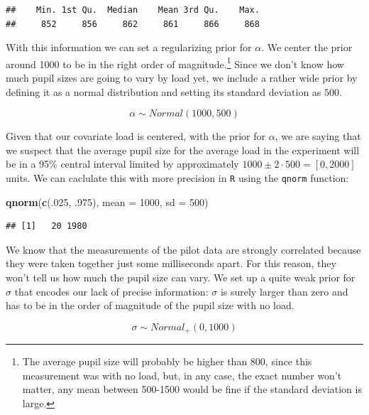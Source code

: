 \documentclass[12pt,]{krantz}
\newenvironment{Shaded}{\begin{snugshade}}{\end{snugshade}}
\newcommand{\DataTypeTok}[1]{\textcolor[rgb]{0.13,0.29,0.53}{#1}}
\newcommand{\DecValTok}[1]{\textcolor[rgb]{0.00,0.00,0.81}{#1}}
\newcommand{\FloatTok}[1]{\textcolor[rgb]{0.00,0.00,0.81}{#1}}
\newcommand{\KeywordTok}[1]{\textcolor[rgb]{0.13,0.29,0.53}{\textbf{#1}}}
\newcommand{\NormalTok}[1]{#1}
\theoremstyle{definition}
\theoremstyle{definition}
\theoremstyle{definition}
\theoremstyle{remark}
\begin{document}
\begin{verbatim}
##    Min. 1st Qu.  Median    Mean 3rd Qu.    Max. 
##     852     856     862     861     866     868
\end{verbatim}

With this information we can set a regularizing prior for \(\alpha\). We center the prior around 1000 to be in the right order of magnitude.\footnote{The average pupil size will probably be higher than 800, since this measurement was with no load, but, in any case, the exact number won't matter, any mean between 500-1500 would be fine if the standard deviation is large.} Since we don't know how much pupil sizes are going to vary by load yet, we include a rather wide prior by defining it as a normal distribution and setting its standard deviation as \(500\).

\begin{equation}
\alpha \sim Normal(1000, 500) 
\end{equation}

Given that our covariate load is centered, with the prior for \(\alpha\), we are saying that we suspect that the average pupil size for the average load in the experiment will be in a 95\% central interval limited by approximately \(1000 \pm 2 \cdot 500 = [0, 2000]\) units. We can caclulate this with more precision in \texttt{R} using the \texttt{qnorm} function:

\begin{Shaded}
\begin{Highlighting}[]
\KeywordTok{qnorm}\NormalTok{(}\KeywordTok{c}\NormalTok{(.}\DecValTok{025}\NormalTok{, }\FloatTok{.975}\NormalTok{), }\DataTypeTok{mean =} \DecValTok{1000}\NormalTok{, }\DataTypeTok{sd =} \DecValTok{500}\NormalTok{)}
\end{Highlighting}
\end{Shaded}

\begin{verbatim}
## [1]   20 1980
\end{verbatim}

We know that the measurements of the pilot data are strongly correlated because they were taken together just some milliseconds apart. For this reason, they won't tell us how much the pupil size can vary. We set up a quite weak prior for \(\sigma\) that encodes our lack of precise information: \(\sigma\) is surely larger than zero and has to be in the order of magnitude of the pupil size with no load.

\begin{equation}
\sigma \sim Normal_+(0, 1000)
\end{equation}
\end{document}
